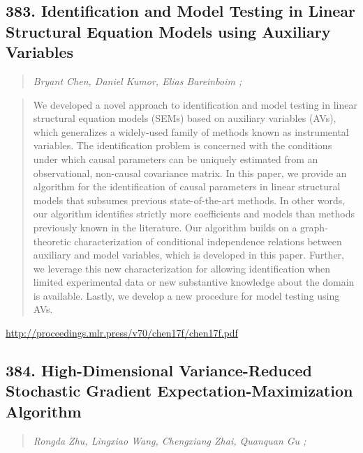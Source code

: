 \documentclass{article}
\begin{document}
\subsection{383. Identification and Model Testing in Linear Structural Equation Models using Auxiliary Variables}

\begin{quote}
\footnotesize{\textit{Bryant Chen, Daniel Kumor, Elias Bareinboim ;}}
\end{quote}

\begin{quote}
    We developed a novel approach to identification and model testing in linear structural equation models (SEMs) based on auxiliary variables (AVs), which generalizes a widely-used family of methods known as instrumental variables. The identification problem is concerned with the conditions under which causal parameters can be uniquely estimated from an observational, non-causal covariance matrix. In this paper, we provide an algorithm for the identification of causal parameters in linear structural models that subsumes previous state-of-the-art methods. In other words, our algorithm identifies strictly more coefficients and models than methods previously known in the literature. Our algorithm builds on a graph-theoretic characterization of conditional independence relations between auxiliary and model variables, which is developed in this paper. Further, we leverage this new characterization for allowing identification when limited experimental data or new substantive knowledge about the domain is available. Lastly, we develop a new procedure for model testing using AVs.  \end{quote}

\href{http://proceedings.mlr.press/v70/chen17f/chen17f.pdf}{http://proceedings.mlr.press/v70/chen17f/chen17f.pdf}

\subsection{384. High-Dimensional Variance-Reduced Stochastic Gradient Expectation-Maximization Algorithm}

\begin{quote}
\footnotesize{\textit{Rongda Zhu, Lingxiao Wang, Chengxiang Zhai, Quanquan Gu ;}}
\end{quote}
\end{document}
